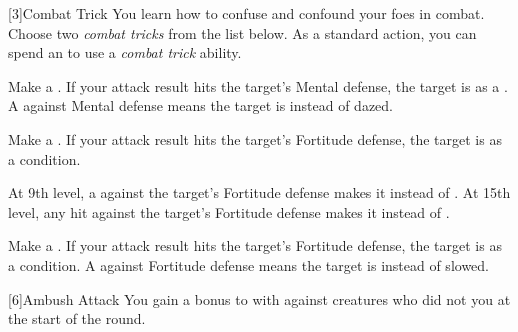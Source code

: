             [3]{Combat Trick}
            You learn how to confuse and confound your foes in combat.
            Choose two \textit{combat tricks} from the list below.
            As a standard action, you can spend an  to use a \textit{combat trick} ability.
            {
                 Make a .
                If your attack result hits the target's Mental defense, the target is \dazed as a .
                A  against Mental defense means the target is \stunned instead of dazed.

                 Make a .
                If your attack result hits the target's Fortitude defense, the target is \sickened as a condition.

                At 9th level, a  against the target's Fortitude defense makes it \nauseated instead of \sickened.
                At 15th level, any hit against the target's Fortitude defense makes it \nauseated instead of \sickened.

                 Make a .
                If your attack result hits the target's Fortitude defense, the target is \slowed as a condition.
                A  against Fortitude defense means the target is \immobilized instead of slowed.
            }





            [6]{Ambush Attack}
            You gain a  bonus to  with  against creatures who did not  you at the start of the round.

